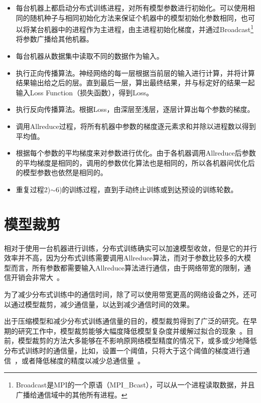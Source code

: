 \begin{itemize}
    \item [1)]
    每台机器上都启动分布式训练进程，对所有模型参数进行初始化。可以使用相同的随机种子与相同初始化方法来保证个机器中的模型初始化参数相同，也可以将某台机器中的进程作为主进程，由主进程初始化梯度，并通过Broadcast\footnote{Broadcast是MPI的一个原语（MPI\_Bcast），可以从一个进程读取数据，并且广播给通信域中的其他所有进程。}将参数广播给其他机器。
    \item [2)]
    每台机器从数据集中读取不同的数据作为输入。
    \item [3)]
    执行正向传播算法。神经网络的每一层根据当前层的输入进行计算，并将计算结果输出给之后的层。直到最后一层，算出最终结果，并与标定好的结果一起输入Loss Function（损失函数），得到Loss。
    \item [4)]
    执行反向传播算法。根据Loss，由深层至浅层，逐层计算出每个参数的梯度。
    \item [5)]
    调用Allreduce过程，将所有机器中参数的梯度逐元素求和并除以进程数以得到平均值。
    \item [6)]
    根据每个参数的平均梯度来对参数进行优化。由于各机器调用Allreduce后参数的平均梯度是相同的，调用的参数优化算法也是相同的，所以各机器间优化后的模型参数也依然是相同的。
    \item [7)]
    重复过程2)$\sim$6)的训练过程，直到手动终止训练或到达预设的训练轮数。
\end{itemize}

\section{模型裁剪}

相对于使用一台机器进行训练，分布式训练确实可以加速模型收敛，但是它的并行效率并不高，因为分布式训练需要调用Allreduce算法，而对于参数比较多的大模型而言，所有参数都需要输入Allreduce算法进行通信，由于网络带宽的限制，通信开销会非常大~\cite{li2014communication, wen2017terngrad}。

为了减少分布式训练中的通信时间，除了可以使用带宽更高的网络设备之外，还可以通过模型裁剪，减少通信量，以达到减少通信时间的效果。

出于压缩模型和减少分布式训练通信量的目的，模型裁剪得到了广泛的研究。在早期的研究工作中，模型裁剪能够大幅度降低模型复杂度并缓解过拟合的现象~\cite{lecun1990optimal, hanson1989comparing, hassibi1993second}。目前，模型裁剪的方法大多能够在不影响原网络模型精度的情况下，或多或少地降低分布式训练时的通信量，比如，设置一个阈值，只将大于这个阈值的梯度进行通信~\cite{strom2015scalable}，或者降低梯度的精度以减少总通信量~\cite{seide20141}。

